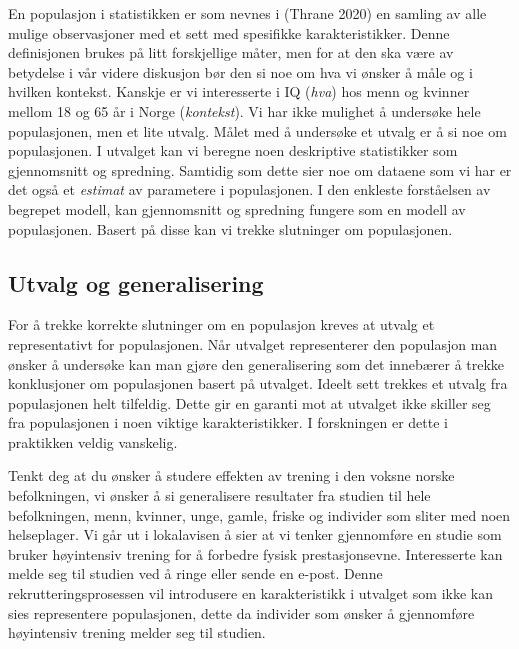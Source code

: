 \documentclass[
  letterpaper,
  DIV=11,
  numbers=noendperiod,
  oneside]{scrreprt}
\begin{document}
En populasjon i statistikken er som nevnes i (Thrane
2020)
en samling av alle mulige observasjoner med et sett med spesifikke
karakteristikker. Denne definisjonen brukes på litt forskjellige måter,
men for at den ska være av betydelse i vår videre diskusjon bør den si
noe om hva vi ønsker å måle og i hvilken kontekst. Kanskje er vi
interesserte i IQ (\emph{hva}) hos menn og kvinner mellom 18 og 65 år i
Norge (\emph{kontekst}). Vi har ikke mulighet å undersøke hele
populasjonen, men et lite utvalg. Målet med å undersøke et utvalg er å
si noe om populasjonen. I utvalget kan vi beregne noen deskriptive
statistikker som gjennomsnitt og spredning. Samtidig som dette sier noe
om dataene som vi har er det også et \emph{estimat} av parametere i
populasjonen. I den enkleste forståelsen av begrepet modell, kan
gjennomsnitt og spredning fungere som en modell av populasjonen. Basert
på disse kan vi trekke slutninger om populasjonen.

\hypertarget{utvalg-og-generalisering}{%
\subsection{Utvalg og generalisering}\label{utvalg-og-generalisering}}

For å trekke korrekte slutninger om en populasjon kreves at utvalg et
representativt for populasjonen. Når utvalget representerer den
populasjon man ønsker å undersøke kan man gjøre den generalisering som
det innebærer å trekke konklusjoner om populasjonen basert på utvalget.
Ideelt sett trekkes et utvalg fra populasjonen helt tilfeldig. Dette gir
en garanti mot at utvalget ikke skiller seg fra populasjonen i noen
viktige karakteristikker. I forskningen er dette i praktikken veldig
vanskelig.

Tenkt deg at du ønsker å studere effekten av trening i den voksne norske
befolkningen, vi ønsker å si generalisere resultater fra studien til
hele befolkningen, menn, kvinner, unge, gamle, friske og individer som
sliter med noen helseplager. Vi går ut i lokalavisen å sier at vi tenker
gjennomføre en studie som bruker høyintensiv trening for å forbedre
fysisk prestasjonsevne. Interesserte kan melde seg til studien ved å
ringe eller sende en e-post. Denne rekrutteringsprosessen vil
introdusere en karakteristikk i utvalget som ikke kan sies representere
populasjonen, dette da individer som ønsker å gjennomføre høyintensiv
trening melder seg til studien.
\end{document}
